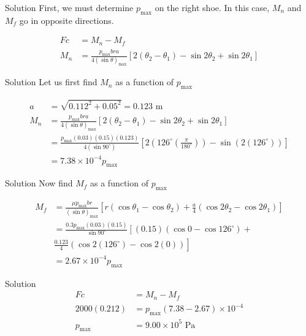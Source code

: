 \documentclass[10pt, svgnames]{beamer}
\begin{document}
\begin{frame}[label={sec:org610c761}]{Solution}
First, we must determine \(p_{\max}\) on the right shoe. In this case, \(M_n\) and \(M_f\) go in opposite directions.

\begin{align*}
    Fc &= M_n - M_f \\
    M_n &= \frac{p_{\max} bra}{4(\sin \theta)_{\max}} [2(\theta_2 - \theta_1) - \sin 2\theta_2 + \sin 2\theta_1]
\end{align*}
\end{frame}

\begin{frame}[label={sec:org69e4934}]{Solution}
Let us first find \(M_n\) as a function of \(p_{\max}\)

\begin{align*}
    a &= \sqrt{ 0.112^2 + 0.05^2 } = 0.123 \text{ m} \\
    M_n &= \frac{p_{\max} bra}{4(\sin \theta)_{\max}} [2(\theta_2 - \theta_1) - \sin 2\theta_2 + \sin 2\theta_1] \\
        &= \frac{p_{\max} (0.03)(0.15)(0.123)}{4 (\sin 90^{\circ})} \left[ 2(126^{\circ}(\frac{\pi}{180^{\circ}})) - \sin (2(126^{\circ})) \right] \\
        &= 7.38 \times 10^{-4} p_{\max}
\end{align*}
\end{frame}

\begin{frame}[label={sec:org4182158}]{Solution}
Now find \(M_f\) as a function of \(p_{\max}\)

\begin{align*}
    M_f &= \frac{\mu p_{\max} br}{(\sin \theta)_{\max}} \left[ r( \cos \theta_1 - \cos \theta_2) + \frac{a}{4}(\cos 2\theta_2 - \cos 2\theta_1) \right] \\
        &= \frac{0.3 p_{\max} (0.03)(0.15)}{\sin 90^{\circ}} \left[ (0.15)(\cos 0 - \cos 126^{\circ}) + \right. \\
         & \left. \frac{0.123}{4}(\cos 2(126^{\circ}) - \cos 2(0)) \right] \\
        &= 2.67 \times 10^{-4} p_{\max}
\end{align*}
\end{frame}

\begin{frame}[label={sec:org149e593}]{Solution}
\begin{align*}
    Fc &= M_n - M_f \\
    2000(0.212) &= p_{\max}(7.38 - 2.67) \times 10^{-4} \\
    p_{\max} &= 9.00 \times 10^5 \text{ Pa}
\end{align*}
\end{frame}
\end{document}
